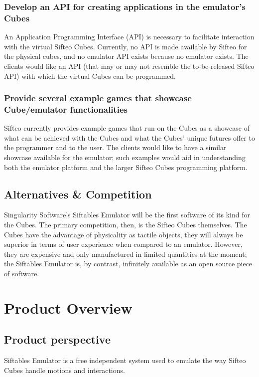 \documentclass[12pt]{article}
\begin{document}
                          \subsubsection{Develop an API for creating applications in the emulator’s Cubes}
                          An Application Programming Interface (API) is necessary to facilitate interaction with the virtual Sifteo Cubes. Currently, no API is made available by Sifteo for the physical cubes, and no emulator API exists because no emulator exists. The clients would like an API (that may or may not resemble the to-be-released Sifteo API) with which the virtual Cubes can be programmed.

                          \subsubsection{Provide several example games that showcase Cube/emulator functionalities}
                          Sifteo currently provides example games that run on the Cubes as a showcase of what can be achieved with the Cubes and what the Cubes’ unique futures offer to the programmer and to the user. The clients would like to have a similar showcase available for the emulator; such examples would aid in understanding both the emulator platform and the larger Sifteo Cubes programming platform.

              \subsection{Alternatives \& Competition}
              Singularity Software's Siftables Emulator will be the first software of its kind for the Cubes. The primary competition, then, is the Sifteo Cubes themselves. The Cubes have the advantage of physicality \- as tactile objects, they will always be superior in terms of user experience when compared to an emulator. However, they are expensive and only manufactured in limited quantities at the moment; the Siftables Emulator is, by contrast, infinitely available as an open source piece of software.

\section{Product Overview}

              \subsection{Product perspective}
              Siftables Emulator is a free independent system used to emulate the way Sifteo Cubes handle motions and interactions.
\end{document}
